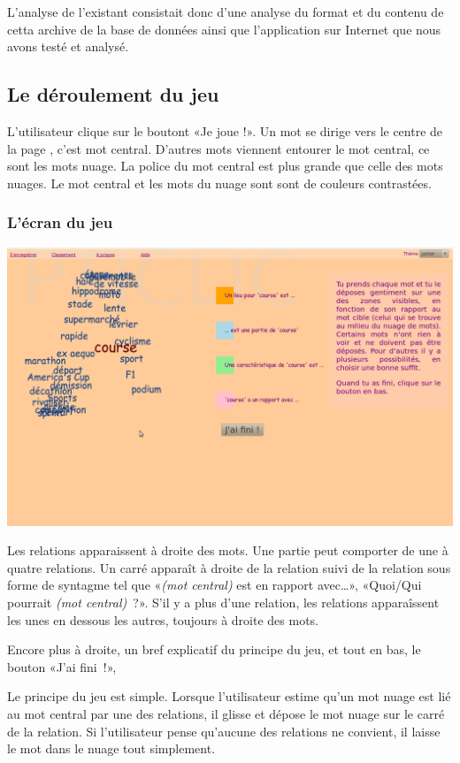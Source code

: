 \documentclass[a4paper,11pt,french]{article}
\begin{document}
L'analyse de l'existant consistait donc d'une analyse du format et du contenu de cetta archive de la base de données ainsi que l'application sur Internet que nous avons testé et analysé.

\subsection{Le déroulement du jeu}
L'utilisateur clique sur le boutont «Je joue !». Un mot se dirige vers le centre de la page , c'est mot central. D'autres mots viennent entourer le mot central, ce sont les mots nuage. La police du mot central est plus grande que celle des mots nuages. Le mot central et les mots du nuage sont sont de couleurs contrastées.

\subsubsection{L'écran du jeu}
\begin{center}
\includegraphics[width=14cm]{img/PtiClicJeu.png}
\end{center}

Les relations apparaissent à droite des mots. Une partie peut comporter de une à quatre relations. Un carré apparaît à droite de la relation suivi de la relation sous forme de syntagme tel que «\emph{(mot central)} est en rapport avec\dots{}», «Quoi/Qui pourrait \emph{(mot central)}~?». S'il y a plus d'une relation, les relations apparaîssent les unes en dessous les autres, toujours à droite des mots.

Encore plus à droite, un bref explicatif du principe du jeu, et tout en bas, le bouton «J'ai fini~!», 

Le principe du jeu est simple. Lorsque l'utilisateur estime qu'un mot nuage est lié au mot central par une des relations, il glisse et dépose le mot nuage sur le carré de la relation. Si l'utilisateur pense qu'aucune des relations ne convient, il laisse le mot dans le nuage tout simplement. 
\end{document}
